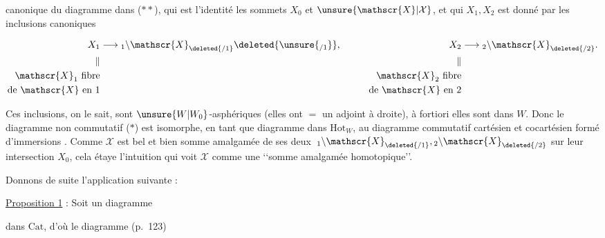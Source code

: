 canonique du diagramme \unsure{($*$)|($\alpha$)} dans ($**$), qui est l'identité  les sommets $X_0$ et $\unsure{\mathscr{X}|\mathcal X}$, et qui   $X_1,X_2$ est donné par les inclusions canoniques

\[
\begin{aligned}
X_1&\longrightarrow{}_1\backslash\mathscr{X}_{\deleted{/1}}\deleted{\unsure{{}_{/1}}},\qquad&
X_2&\longrightarrow{}_2\backslash\mathscr{X}_{\deleted{/2}}.\\
\Vert&&\Vert\\
\mathscr{X}_1\ \text{fibre}&&\mathscr{X}_2\ \text{fibre}\\
\text{de }\mathscr{X}\text{ en }1&&\text{de }\mathscr{X}\text{ en }2
\end{aligned}
\]

Ces inclusions, on  le sait, sont $\unsure{W|W_0}$-asphériques (elles ont $=$ un adjoint à droite), à fortiori elles sont dans $W$. Donc le diagramme non commutatif ($*$) est isomorphe, en tant que diagramme dans $\mathrm{Hot}_W$, au diagramme commutatif cartésien et cocartésien \inserted{($**$)} formé d'immersions . Comme $\mathscr{X}$ est bel et bien somme amalgamée de ses deux  $\,{}_1\backslash\mathscr{X}_{\deleted{/1}},{}_2\backslash\mathscr{X}_{\deleted{/2}}$ sur leur intersection $X_0$, cela étaye l'intuition qui  voit $\mathscr{X}$ comme une \lq\lq somme amalgamée \unsure{\lq\lq}homotopique\rq\rq. \unsure{$\S$}

Donnons  de suite l'application suivante :

\uline{Proposition 1} : Soit un diagramme

dans $\mathrm{Cat}$, d'où le diagramme \unsure{($\alpha$)|($*$)} (p.~123)

